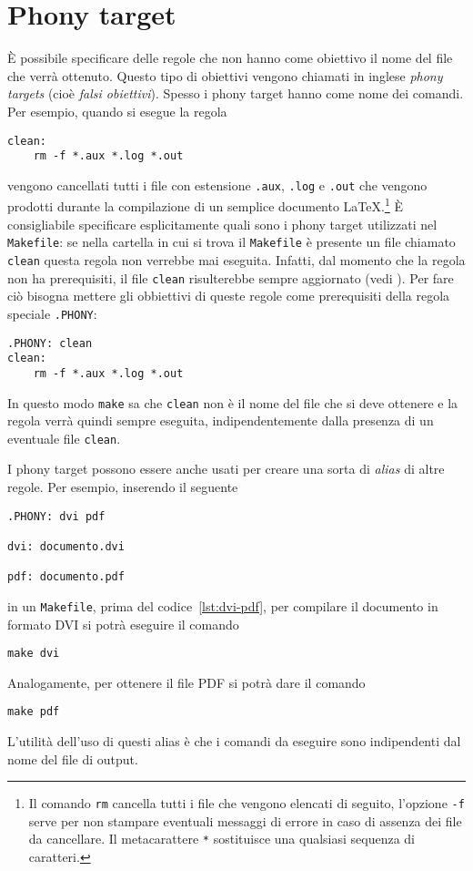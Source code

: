 \section{Phony target}
\label{sec:phony}

È possibile specificare delle regole che non hanno come obiettivo il nome del
file che verrà ottenuto.  Questo tipo di obiettivi vengono chiamati in inglese
\emph{phony targets} (cioè \emph{falsi obiettivi}).  Spesso i phony target hanno
come nome dei comandi. Per esempio, quando si esegue la regola
\begin{lstlisting}
clean:
	rm -f *.aux *.log *.out
\end{lstlisting}
vengono cancellati tutti i file con estensione \verb|.aux|, \verb|.log| e
\verb|.out| che vengono prodotti durante la compilazione di un semplice
documento
\LaTeX.\footnote{Il comando \texttt{rm} cancella tutti i file che vengono
  elencati di seguito, l'opzione \texttt{-f} serve per non stampare eventuali
  messaggi di errore in caso di assenza dei file da cancellare.  Il
  metacarattere \texttt{*} sostituisce una qualsiasi sequenza di caratteri.}
È consigliabile specificare esplicitamente quali sono i phony target utilizzati
nel \verb|Makefile|: se nella cartella in cui si trova il \verb|Makefile| è
presente un file chiamato \verb|clean| questa regola non verrebbe mai eseguita.
Infatti, dal momento che la regola non ha prerequisiti, il file \texttt{clean}
risulterebbe sempre aggiornato (vedi \textcite[31]{gnu:make}).  Per fare ciò
bisogna mettere gli obbiettivi di queste regole come prerequisiti della regola
speciale \verb|.PHONY|:
\begin{lstlisting}
.PHONY: clean
clean:
	rm -f *.aux *.log *.out
\end{lstlisting}
In questo modo \verb|make| sa che \verb|clean| non è il nome del file che si
deve ottenere e la regola verrà quindi sempre eseguita, indipendentemente dalla
presenza di un eventuale file \verb|clean|.

I phony target possono essere anche usati per creare una sorta di \emph{alias}
di altre regole.  Per esempio, inserendo il seguente
\begin{lstlisting}[caption={I prerequisiti della regola dell'obiettivo
\texttt{.PHONY} sono i nomi dei phony target che vengono successivamente
specificati.},label=lst:phony]
.PHONY: dvi pdf

dvi: documento.dvi

pdf: documento.pdf
\end{lstlisting}
in un \verb|Makefile|, prima del codice~\ref{lst:dvi-pdf}, per compilare il
documento in formato \textsc{DVI} si potrà eseguire il comando
\begin{verbatim}
make dvi
\end{verbatim}
Analogamente, per ottenere il file \textsc{PDF} si potrà dare il comando
\begin{verbatim}
make pdf
\end{verbatim}
L'utilità dell'uso di questi alias è che i comandi da eseguire sono indipendenti
dal nome del file di output.

